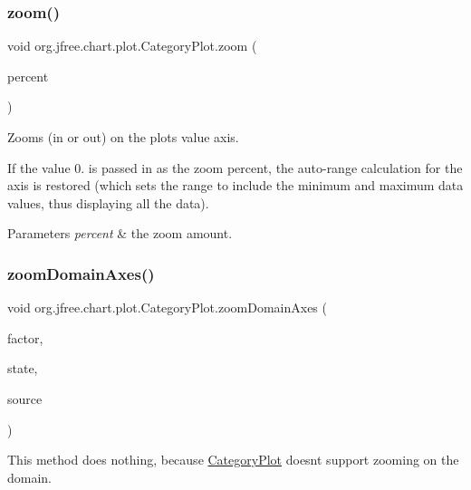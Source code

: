 \subsubsection{\texorpdfstring{zoom()}{zoom()}}
{\footnotesize\ttfamily void org.\+jfree.\+chart.\+plot.\+Category\+Plot.\+zoom (\begin{DoxyParamCaption}\item[{double}]{percent }\end{DoxyParamCaption})}

Zooms (in or out) on the plot\textquotesingle{}s value axis. 

If the value 0. is passed in as the zoom percent, the auto-\/range calculation for the axis is restored (which sets the range to include the minimum and maximum data values, thus displaying all the data).


\begin{DoxyParams}{Parameters}
{\em percent} & the zoom amount. \\
\hline
\end{DoxyParams}
\mbox{\label{classorg_1_1jfree_1_1chart_1_1plot_1_1_category_plot_ac5d755df917d1dc10019555e312d9bf4}} 
\subsubsection{\texorpdfstring{zoom\+Domain\+Axes()}{zoomDomainAxes()}\hspace{0.1cm}{\footnotesize\ttfamily [1/3]}}
{\footnotesize\ttfamily void org.\+jfree.\+chart.\+plot.\+Category\+Plot.\+zoom\+Domain\+Axes (\begin{DoxyParamCaption}\item[{double}]{factor,  }\item[{\mbox{\hyperlink{classorg_1_1jfree_1_1chart_1_1plot_1_1_plot_rendering_info}{Plot\+Rendering\+Info}}}]{state,  }\item[{Point2D}]{source }\end{DoxyParamCaption})}

This method does nothing, because {\ttfamily \mbox{\hyperlink{classorg_1_1jfree_1_1chart_1_1plot_1_1_category_plot}{Category\+Plot}}} doesn\textquotesingle{}t support zooming on the domain.


